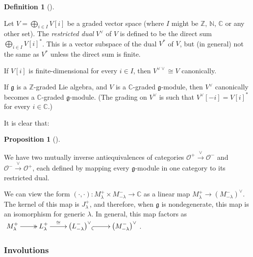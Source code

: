 \documentclass
[numbers=enddot,12pt,final,onecolumn,german,notitlepage]{scrartcl}%
\makeatletter
\newcommand{\arinj}{\ar@{_{(}->}}
\newcommand{\arsurj}{\ar@{->>}}
\theoremstyle{definition}
\newtheorem{prop}[theo]{Proposition}
\newenvironment{proposition}[1][]
{\begin{prop}[#1]\begin{leftbar}}
{\end{leftbar}\end{prop}}
\newtheorem{defi}[theo]{Definition}
\newenvironment{definition}[1][]
{\begin{defi}[#1]\begin{leftbar}}
{\end{leftbar}\end{defi}}
\makeatother
\begin{document}
\begin{definition}
Let $V=\bigoplus\limits_{i\in I}V\left[  i\right]  $ be a graded vector space
(where $I$ might be $\mathbb{Z}$, $\mathbb{N}$, $\mathbb{C}$ or any other
set). The \textit{restricted dual} $V^{\vee}$ of $V$ is defined to be the
direct sum $\bigoplus\limits_{i\in I}V\left[  i\right]  ^{\ast}$. This is a
vector subspace of the dual $V^{\ast}$ of $V$, but (in general) not the same
as $V^{\ast}$ unless the direct sum is finite.

If $V\left[  i\right]  $ is finite-dimensional for every $i\in I$, then
$V^{\vee\vee}\cong V$ canonically.

If $\mathfrak{g}$ is a $\mathbb{Z}$-graded Lie algebra, and $V$ is a
$\mathbb{C}$-graded $\mathfrak{g}$-module, then $V^{\vee}$ canonically becomes
a $\mathbb{C}$-graded $\mathfrak{g}$-module. (The grading on $V^{\vee}$ is
such that $V^{\vee}\left[  -i\right]  =V\left[  i\right]  ^{\ast}$ for every
$i\in\mathbb{C}$.)
\end{definition}

It is clear that:

\begin{proposition}
We have two mutually inverse antiequivalences of categories $\mathcal{O}%
^{+}\overset{\vee}{\rightarrow}\mathcal{O}^{-}$ and $\mathcal{O}%
^{-}\overset{\vee}{\rightarrow}\mathcal{O}^{+}$, each defined by mapping every
$\mathfrak{g}$-module in one category to its restricted dual.
\end{proposition}

We can view the form $\left(  \cdot,\cdot\right)  :M_{\lambda}^{+}\times
M_{-\lambda}^{-}\rightarrow\mathbb{C}$ as a linear map $M_{\lambda}%
^{+}\rightarrow\left(  M_{-\lambda}^{-}\right)  ^{\vee}$. The kernel of this
map is $J_{\lambda}^{+}$, and therefore, when $\mathfrak{g}$ is nondegenerate,
this map is an isomorphism for generic $\lambda$. In general, this map factors
as $%
\xymatrix{
M^{+}_{\lambda} \arsurj[r] & L^{+}_{\lambda} \ar[r]^-{\cong} &
\left(L^{-}_{-\lambda}\right)^{\vee} \arinj[r] & \left(M^{-}_{-\lambda}%
\right)^{\vee}
}%
$.

\subsubsection{Involutions}
\end{document}
